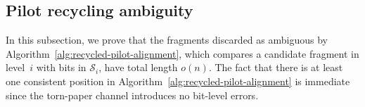 \documentclass[journal,letterpaper,onecolumn,11pt]{IEEEtran}
\newcommand{\cS}{\mathcal{S}}
\begin{document}
\subsection{Pilot recycling ambiguity}\label{subsection:coverage-and-ambiguity}
In this subsection, we prove that the fragments discarded as ambiguous by
Algorithm~\ref{alg:recycled-pilot-alignment}, which compares a candidate
fragment in level~$i$ with bits in $\cS_i$, have total length $o(n)$. 
The fact that there is at least one consistent position in Algorithm~\ref{alg:recycled-pilot-alignment} is immediate since the torn-paper channel introduces no bit-level errors.
\end{document}
